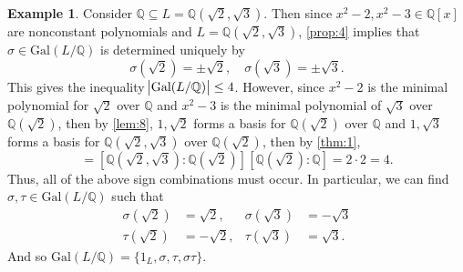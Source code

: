 \documentclass[leqno]{article}
\theoremstyle{definition}
\theoremstyle{remark}
\theoremstyle{definition}
\newtheorem{example}{Example}
\begin{document}
    \begin{example}\label{ex:2}
        Consider $\mathbb{Q}\subseteq L=\mathbb{Q}(\sqrt{2},\sqrt{3})$. Then since $x^2-2,x^2-3\in\mathbb{Q}[x]$ are nonconstant polynomials and $L=\mathbb{Q}(\sqrt{2},\sqrt{3})$, \cref{prop:4} implies that $\sigma\in\text{Gal}(L/\mathbb{Q})$ is determined uniquely by
            \begin{equation*}
                \sigma(\sqrt{2})=\pm\sqrt{2},\quad\sigma(\sqrt{3})=\pm\sqrt{3}.
            \end{equation*}
        This gives the inequality $\abs{\text{Gal}(L/\mathbb{Q})}\leq 4$. However, since $x^2-2$ is the minimal polynomial for $\sqrt{2}$ over $\mathbb{Q}$ and $x^2-3$ is the minimal polynomial of $\sqrt{3}$ over $\mathbb{Q}(\sqrt{2})$, then by \cref{lem:8}, $1,\sqrt{2}$ forms a basis for $\mathbb{Q}(\sqrt{2})$ over $\mathbb{Q}$ and $1,\sqrt{3}$ forms a basis for $\mathbb{Q}(\sqrt{2},\sqrt{3})$ over $\mathbb{Q}(\sqrt{2})$, then by \cref{thm:1},
            \begin{equation*}
                [\mathbb{Q}(\sqrt{2},\sqrt{3})\colon\mathbb{Q}]=[\mathbb{Q}(\sqrt{2},\sqrt{3})\colon\mathbb{Q}(\sqrt{2})][\mathbb{Q}(\sqrt{2})\colon\mathbb{Q}]=2\cdot2=4.
            \end{equation*}
        Thus, all of the above sign combinations must occur. In particular, we can find $\sigma,\tau\in\text{Gal}(L/\mathbb{Q})$ such that 
            \begin{align*}
                \sigma(\sqrt{2})&=\sqrt{2}, & \sigma(\sqrt{3})&=-\sqrt{3} \\
                \tau(\sqrt{2})&=-\sqrt{2},& \tau(\sqrt{3})&=\sqrt{3}.
            \end{align*}
        And so $\text{Gal}(L/\mathbb{Q})=\{1_L,\sigma,\tau,\sigma\tau\}$.
    \end{example}
\end{document}
